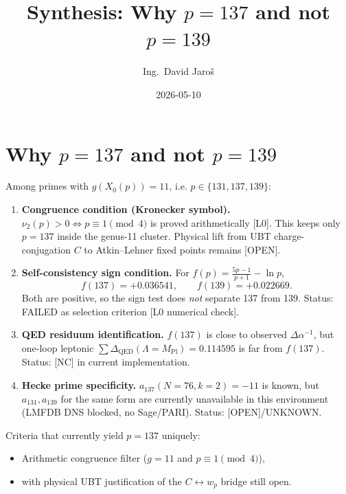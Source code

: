 \documentclass[12pt,a4paper]{article}
\title{Synthesis: Why $p=137$ and not $p=139$}
\author{Ing.\ David Jaro\v{s}}
\date{2026-05-10}
\begin{document}
  \maketitle
\fi

\section{Why $p=137$ and not $p=139$}

Among primes with $g(X_0(p))=11$, i.e. $p\in\{131,137,139\}$:

\begin{enumerate}
\item \textbf{Congruence condition (Kronecker symbol).}
$\nu_2(p)>0 \iff p\equiv1\pmod4$ is proved arithmetically [L0].
This keeps only $p=137$ inside the genus-11 cluster.
Physical lift from UBT charge-conjugation $C$ to Atkin--Lehner fixed points
remains [OPEN].

\item \textbf{Self-consistency sign condition.}
For
$f(p)=\frac{5p-1}{p+1}-\ln p$,
\begin{equation}
f(137)=+0.036541,\qquad f(139)=+0.022669.
\end{equation}
Both are positive, so the sign test does \emph{not} separate 137 from 139.
Status: FAILED as selection criterion [L0 numerical check].

\item \textbf{QED residuum identification.}
$f(137)$ is close to observed $\Delta\alpha^{-1}$, but one-loop leptonic
$\sum\Delta_{\mathrm{QED}}(\Lambda=M_{\mathrm{Pl}})=0.114595$ is far from $f(137)$.
Status: [NC] in current implementation.

\item \textbf{Hecke prime specificity.}
$a_{137}(N=76,k=2)=-11$ is known, but $a_{131},a_{139}$ for the same form are
currently unavailable in this environment (LMFDB DNS blocked, no Sage/PARI).
Status: [OPEN]/UNKNOWN.
\end{enumerate}

Criteria that currently yield $p=137$ uniquely:
\begin{itemize}
  \item Arithmetic congruence filter ($g=11$ and $p\equiv1\pmod4$),
  \item with physical UBT justification of the $C\leftrightarrow w_p$ bridge still open.
\end{itemize}
\end{document}

